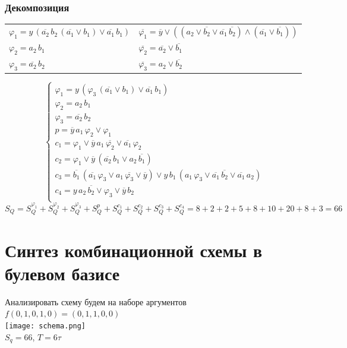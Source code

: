 \documentclass[12pt,a4paper]{report}
\begin{document}
\subsubsection*{Декомпозиция}
\begin{tabular}{ll}
    $\varphi_1=y\,(\overline{a_2}\,b_2\,(\overline{a_1} \lor b_1) \lor \overline{a_1}\,b_1)$ & $\overline{\varphi_1}=\overline{y} \lor ((a_2 \lor \overline{b_2} \lor \overline{a_1}\,\overline{b_2})\land (\overline{a_1} \lor \overline{b_1}))$\\
    $\varphi_2=a_2\,b_1$ & $\overline{\varphi_2}=\overline{a_2}\lor\overline{b_1}$\\
    $\varphi_3=\overline{a_2}\,b_2$ & $\overline{\varphi_3}=a_2\lor\overline{b_2}$
\end{tabular}

\begin{equation*}
    \begin{cases}
        \varphi_1=y\,(\varphi_3\,(\overline{a_1} \lor b_1) \lor \overline{a_1}\,b_1)\\
        \varphi_2=a_2\,b_1\\
        \varphi_3=\overline{a_2}\,b_2\\
        p=\overline{y}\,a_1\,\varphi_2 \lor \varphi_1\\
        c_1=\varphi_1 \lor \overline{y}\,a_1\,\overline{\varphi_2}\lor \overline{a_1}\,\varphi_2\\
        c_2=\varphi_1 \lor \overline{y}\,(\overline{a_2}\,b_1 \lor a_2\,\overline{b_1})\\
        c_3=\overline{b_1}\,(\overline{a_1}\,\varphi_3 \lor a_1\,\overline{\varphi_3} \lor \overline{y}) \lor y\,b_1\,(a_1\,\varphi_3\lor\overline{a_1}\,\overline{b_2}\lor\overline{a_1}\,a_2)\\
        c_4=y\,a_2\,\overline{b_2} \lor \varphi_3 \lor \overline{y}\,b_2\\
    \end{cases}
\end{equation*}
$S_Q=S_Q^{\varphi_1}+S_Q^{\varphi_2}+S_Q^{\varphi_3}+S_Q^p+S_Q^{c_1}+S_Q^{c_2}+S_Q^{c_3}+S_Q^{c_4}=8+2+2+5+8+10+20+8+3=66$
\newpage
\section*{Синтез комбинационной схемы в булевом базисе}
Анализировать схему будем на наборе аргументов $f(0, 1, 0, 1, 0) = (0, 1, 1, 0, 0)$\\
\hfill\break
\texttt{[image: schema.png]}\\
\hfill\break
$S_q=66$, $T=6\tau$
\end{document}
